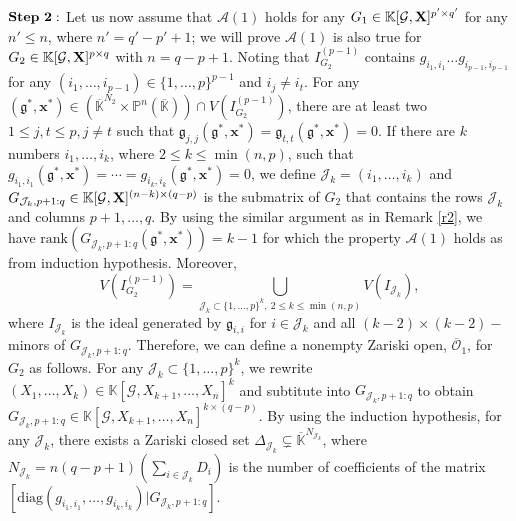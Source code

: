 \documentclass[11pt]{article}
\numberwithin{Property}{section}
\numberwithin{Theorem}{section}
\numberwithin{Proposition}{section}
\numberwithin{Lemma}{section}
\numberwithin{Corollary}{section}
\numberwithin{Definition}{section}
\numberwithin{Remark}{section}
\numberwithin{Conjecture}{section}
\numberwithin{Problem}{section}
\numberwithin{Example}{section}
\numberwithin{Claim}{section}
\renewcommand{\leq}{\leqslant}
\def\bar{\overline}
\newcommand{\field}{\mathbb{K}} %
\newcommand{\mat}[1]{\mathbf{\MakeUppercase{#1}}} %
\begin{document}
$\bf{Step \ 2:}$ Let us now assume that $\mathcal{A}(1)$ holds for any $G_1 \in \field[{\mathcal{G}, \mat{X}}]^{p' \times q'}$ for any $n' \leq n$, where $n' = q'-p'+1$; we will prove $\mathcal{A}(1)$ is also true for $G_2 \in \field[\mathcal{G}, \mat{X}]^{p \times q}$ with $n = q-p+1$. Noting that $I_{G_2}^{(p-1)}$ contains $g_{i_1, i_1}\ldots g_{i_{p-1}, i_{p-1}}$ for any $(i_1, \ldots, i_{p-1}) \in \{1, \ldots, p\}^{p-1}$ and $i_j \ne i_t$. For any $(\mathfrak{g}^*, \mathbf{x}^*) \in (\bar{\field}^{N_2} \times \mathbb{P}^{n}(\bar{\field})) \cap V(I_{G_2}^{(p-1)})$, there are at least two $1\leq j,t \leq p, j \ne t$ such that $\mathfrak{g}_{j,j}(\mathfrak{g}^*, \mathbf{x}^*) = \mathfrak{g}_{t,t}(\mathfrak{g}^*, \mathbf{x}^*) = 0$. If there are $k$ numbers $i_1, \ldots, i_k$, where $2 \leq k \leq \min(n,p)$, such that $g_{i_1, i_1}(\mathfrak{g}^*, \mathbf{x}^*) = \cdots = g_{i_k, i_k}(\mathfrak{g}^*, \mathbf{x}^*) = 0$, we define $\mathcal{J}_k = (i_1, \ldots, i_k)$ and $G_{\mathcal{J}_k, p+1:q} \in \field[\mathcal{G}, \mat{X}]^{(n-k)\times (q-p)}$ is the submatrix of $G_2$ that contains the rows $\mathcal{J}_k$ and columns $p+1, \ldots, q$. By using the similar argument as in Remark \ref{r2}, we have $\mathrm{rank}(G_{\mathcal{J}_k, p+1:q}(\mathfrak{g}^*, \mathbf{x}^*)) = k-1$ for which the property $\mathcal{A}(1)$ holds as from induction hypothesis. Moreover, $$V(I_{G_2}^{(p-1)}) = \bigcup\limits_{\mathcal{J}_k \subset\{1, \ldots, p\}^k, \ 2 \leq k \leq \min(n,p)} V(I_{\mathcal{J}_k}),$$ where $I_{\mathcal{J}_k}$ is the ideal generated by $\mathfrak{g}_{i,i}$ for $i \in \mathcal{J}_k$ and all $(k-2)\times(k-2) -$ minors of $G_{\mathcal{J}_k, p+1:q}$. Therefore, we can define a nonempty Zariski open, $\bar{\mathcal{O}}_1$, for $G_2$ as follows. For any $\mathcal{J}_k \subset \{1, \ldots, p\}^k$, we rewrite $(X_1, \ldots, X_k) \in \field[\mathcal{G}, X_{k+1}, \ldots, X_n]^{k}$ and subtitute into $G_{\mathcal{J}_k, p+1:q}$ to obtain $G_{\mathcal{J}_k, p+1:q} \in \field[\mathcal{G}, X_{k+1}, \ldots, X_n]^{k \times {(q-p)}}$. By using the induction hypothesis, for any $\mathcal{J}_k$, there exists a Zariski closed set $\Delta_{\mathcal{J}_k} \subsetneq \bar{\field}^{N_{\mathcal{J}_k}}$, where $N_{\mathcal{J}_k} = n(q-p+1)(\sum_{i \in \mathcal{J}_k}D_i)$ is the number of coefficients of the matrix $[\mathrm{diag}(g_{i_1, i_1}, \ldots, g_{i_k, i_k})|G_{\mathcal{J}_k, p+1:q}]$. %
\end{document}
